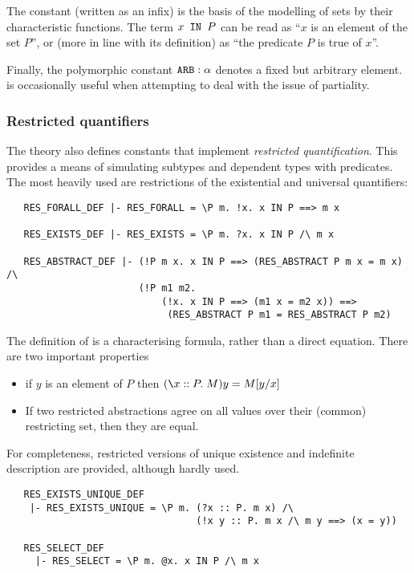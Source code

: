 The constant  (written as an infix) is the basis of
the modelling of sets by their characteristic functions.  The term
$x\holtxt{ IN }P$ can be read as ``$x$ is an element of the set
$P$'', or (more in line with its definition) as ``the predicate $P$ is
true of $x$''.

Finally, the polymorphic constant $\holtxt{ARB}:\alpha$ denotes a
fixed but arbitrary element.  is occasionally useful when
attempting to deal with the issue of partiality.

\subsubsection{Restricted quantifiers}\label{res-quant}

%
The theory  also defines constants that implement
\emph{restricted quantification}. This provides a means of simulating
subtypes and dependent types with predicates. The most heavily used
are restrictions of the existential and universal quantifiers:
%
\begin{verbatim}
   RES_FORALL_DEF |- RES_FORALL = \P m. !x. x IN P ==> m x

   RES_EXISTS_DEF |- RES_EXISTS = \P m. ?x. x IN P /\ m x

   RES_ABSTRACT_DEF |- (!P m x. x IN P ==> (RES_ABSTRACT P m x = m x) /\
                       (!P m1 m2.
                           (!x. x IN P ==> (m1 x = m2 x)) ==>
                            (RES_ABSTRACT P m1 = RES_ABSTRACT P m2)
\end{verbatim}
%
The definition of  is a characterising formula, rather
than a direct equation.  There are two important properties
\begin{itemize}
\item if $y$ is an element of $P$ then $(\bs{}x :: P.\; M)
  y = M[y/x]$
\item If two restricted abstractions agree on all values over their
  (common) restricting set, then they are equal.
\end{itemize}

For completeness, restricted versions of unique existence and
indefinite description are provided, although hardly used.
\begin{verbatim}
   RES_EXISTS_UNIQUE_DEF
    |- RES_EXISTS_UNIQUE = \P m. (?x :: P. m x) /\
                                 (!x y :: P. m x /\ m y ==> (x = y))

   RES_SELECT_DEF
     |- RES_SELECT = \P m. @x. x IN P /\ m x
\end{verbatim}

